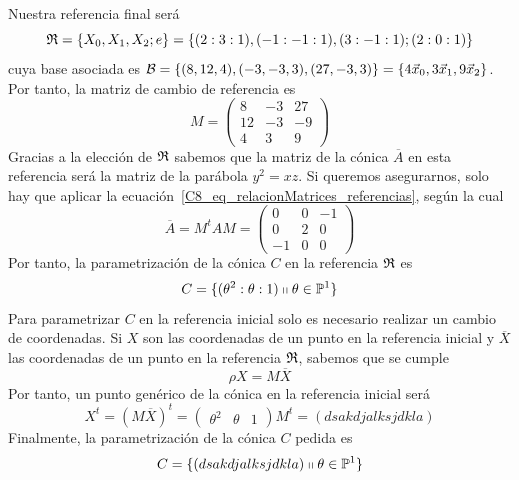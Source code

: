\begin{exa}
	Nuestra referencia final será
	\[\mathfrak{R}=\{X_0,X_1,X_2;e\}=\{(2:3:1),(-1:-1:1),(3:-1:1);(2:0:1)\}\]
	cuya base asociada es $\mathcal{B}=\{(8,12,4),(-3,-3,3),(27,-3,3)\}=\{4\vec{x}_0,3\vec{x}_1,9\vec{x}_2\}$. Por tanto, la matriz de cambio de referencia es
	\begin{equation*}
		M=\left( \begin{array}{ccc}
			8&-3&27\\
			12&-3 &-9\\
			4&3&9
		\end{array}\right) 
	\end{equation*}
	Gracias a la elección de $\mathfrak{R}$ sabemos que la matriz de la cónica $\overline{A}$ en esta referencia será la matriz de la parábola $y^2=xz$. Si queremos asegurarnos, solo hay que aplicar la ecuación~\eqref{C8_eq_relacionMatrices_referencias}, según la cual
	\begin{equation*}
		\overline{A}=M^tAM=
		\left( \begin{array}{ccc}
		0 & 0 & -1\\
		0 & 2 & 0\\
		-1 & 0 & 0
		\end{array}\right)
	\end{equation*}
	Por tanto, la parametrización de la cónica $C$ en la referencia $\mathfrak{R}$ es 
	\begin{equation*}
	 C=\{(\theta^2:\theta:1)\shortparallel \theta\in\mathbb{P}^1\}
	\end{equation*}
	Para parametrizar $C$ en la referencia inicial solo es necesario realizar un cambio de coordenadas. Si $X$ son las coordenadas de un punto en la referencia inicial y $\overline{X}$ las coordenadas de un punto en la referencia $\mathfrak{R}$, sabemos que se cumple
	\begin{equation*}
		\rho X=M\overline{X}
	\end{equation*}
	Por tanto, un punto genérico de la cónica en la referencia inicial será
	\begin{equation}
		X^t=(M\overline{X})^t=
		\begin{pmatrix}
		\theta^2 & \theta & 1
		\end{pmatrix}M^t=(dsakdjalksjdkla)
	\end{equation}
	Finalmente, la parametrización de la cónica $C$ pedida es
	\begin{equation*}
		C=\{(dsakdjalksjdkla)\shortparallel \theta\in\mathbb{P}^1\}
	\end{equation*}
\end{exa}
